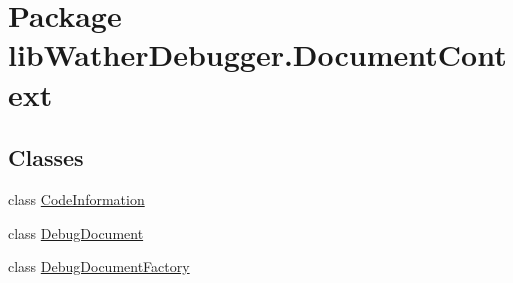 \hypertarget{namespacelib_wather_debugger_1_1_document_context}{\section{Package lib\+Wather\+Debugger.\+Document\+Context}
\label{namespacelib_wather_debugger_1_1_document_context}
}
\subsection*{Classes}
\begin{DoxyCompactItemize}
\item 
class \hyperlink{classlib_wather_debugger_1_1_document_context_1_1_code_information}{Code\+Information}
\item 
class \hyperlink{classlib_wather_debugger_1_1_document_context_1_1_debug_document}{Debug\+Document}
\item 
class \hyperlink{classlib_wather_debugger_1_1_document_context_1_1_debug_document_factory}{Debug\+Document\+Factory}
\end{DoxyCompactItemize}
